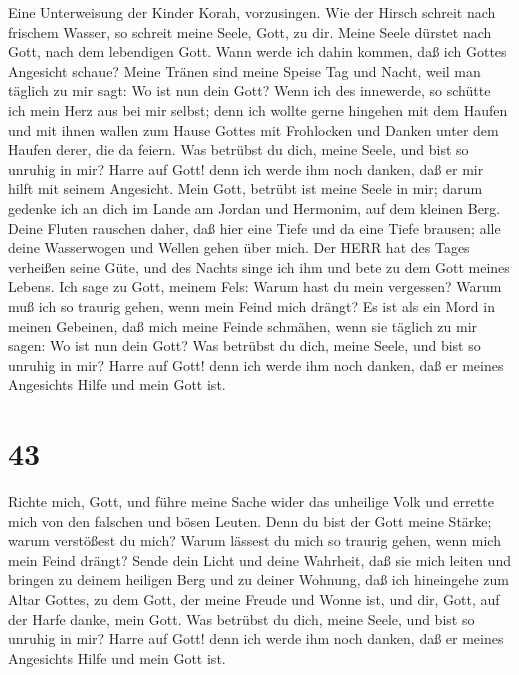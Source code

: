  Eine Unterweisung der Kinder Korah, vorzusingen. Wie der
Hirsch schreit nach frischem Wasser, so schreit meine Seele, Gott, zu
dir.  Meine Seele dürstet nach Gott, nach dem lebendigen
Gott. Wann werde ich dahin kommen, daß ich Gottes Angesicht schaue?
 Meine Tränen sind meine Speise Tag und Nacht, weil man
täglich zu mir sagt: Wo ist nun dein Gott?  Wenn ich des
innewerde, so schütte ich mein Herz aus bei mir selbst; denn ich wollte
gerne hingehen mit dem Haufen und mit ihnen wallen zum Hause Gottes mit
Frohlocken und Danken unter dem Haufen derer, die da feiern.
 Was betrübst du dich, meine Seele, und bist so unruhig in
mir? Harre auf Gott! denn ich werde ihm noch danken, daß er mir hilft
mit seinem Angesicht.  Mein Gott, betrübt ist meine Seele in
mir; darum gedenke ich an dich im Lande am Jordan und Hermonim, auf dem
kleinen Berg.  Deine Fluten rauschen daher, daß hier eine
Tiefe und da eine Tiefe brausen; alle deine Wasserwogen und Wellen gehen
über mich.  Der HERR hat des Tages verheißen seine Güte, und
des Nachts singe ich ihm und bete zu dem Gott meines Lebens.
 Ich sage zu Gott, meinem Fels: Warum hast du mein
vergessen? Warum muß ich so traurig gehen, wenn mein Feind mich drängt?
 Es ist als ein Mord in meinen Gebeinen, daß mich meine
Feinde schmähen, wenn sie täglich zu mir sagen: Wo ist nun dein Gott?
 Was betrübst du dich, meine Seele, und bist so unruhig in
mir? Harre auf Gott! denn ich werde ihm noch danken, daß er meines
Angesichts Hilfe und mein Gott ist.

\hypertarget{section-42}{%
\section{43}\label{section-42}}

 Richte mich, Gott, und führe meine Sache wider das
unheilige Volk und errette mich von den falschen und bösen Leuten.
 Denn du bist der Gott meine Stärke; warum verstößest du
mich? Warum lässest du mich so traurig gehen, wenn mich mein Feind
drängt?  Sende dein Licht und deine Wahrheit, daß sie mich
leiten und bringen zu deinem heiligen Berg und zu deiner Wohnung,
 daß ich hineingehe zum Altar Gottes, zu dem Gott, der meine
Freude und Wonne ist, und dir, Gott, auf der Harfe danke, mein Gott.
 Was betrübst du dich, meine Seele, und bist so unruhig in
mir? Harre auf Gott! denn ich werde ihm noch danken, daß er meines
Angesichts Hilfe und mein Gott ist.

